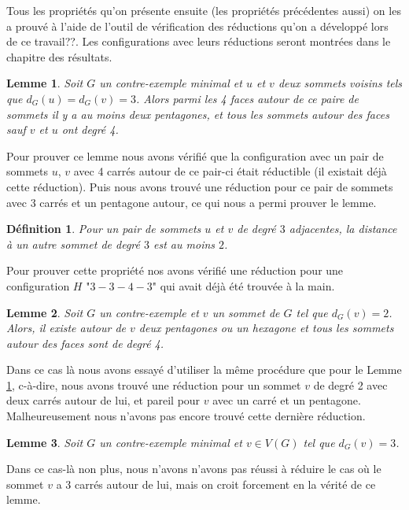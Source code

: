 \documentclass[10pt,a4paper]{article}
\newtheorem{definition}{Définition}
\newtheorem{lemme}{Lemme}
\begin{document}
Tous les propriétés qu'on présente ensuite (les propriétés précédentes aussi) on les a prouvé à l'aide de l'outil de vérification des réductions qu'on a développé lors de ce {\color{blue}travail??}. Les configurations avec leurs réductions seront montrées dans le chapitre des résultats.

\begin{lemme}
Soit $G$ un contre-exemple minimal et $u$ et $v$ deux sommets voisins tels que $d_G(u)=d_G(v) = 3$. Alors parmi les 4 faces autour de ce paire de sommets il y a au moins deux pentagones, et tous les sommets autour des faces sauf $v$ et $u$ ont degré 4.
\label{le:33pent}
\end{lemme}

Pour prouver ce lemme nous avons vérifié que la configuration avec un pair de sommets $u$, $v$ avec 4 carrés autour de ce pair-ci était réductible (il existait déjà cette réduction). Puis nous avons trouvé une réduction pour ce pair de sommets avec 3 carrés et un pentagone autour, ce qui nous a permi prouver le lemme.

\begin{definition}
Pour un pair de sommets $u$ et $v$ de degré $3$ adjacentes, la distance à un autre sommet de degré $3$ est au moins $2$.
\label{de:3343}
\end{definition}

Pour prouver cette propriété nos avons vérifié une réduction pour une configuration $H$ "$3-3-4-3$" qui avait déjà été trouvée à la main. 


\begin{lemme}
Soit $G$ un contre-exemple et $v$ un sommet de $G$ tel que $d_G(v) = 2$. Alors, il existe autour de $v$ deux pentagones ou un hexagone et tous les sommets autour des faces sont de degré 4.
\label{le:2pent}
\end{lemme}

Dans ce cas là nous avons essayé d'utiliser la même procédure que pour le Lemme \ref{le:33pent}, c-à-dire, nous avons trouvé une réduction pour un sommet $v$ de degré 2 avec deux carrés autour de lui, et pareil pour $v$ avec un carré et un pentagone. Malheureusement nous n'avons pas encore trouvé cette dernière réduction.

\begin{lemme}
Soit $G$ un contre-exemple minimal et $v \in V(G)$ tel que $d_G(v) = 3$.
\label{le:3}
\end{lemme}

Dans ce cas-là non plus, nous n'avons  n'avons pas réussi à réduire le cas où le sommet $v$ a 3 carrés autour de lui, mais on croit forcement en la vérité de ce lemme.
\end{document}
